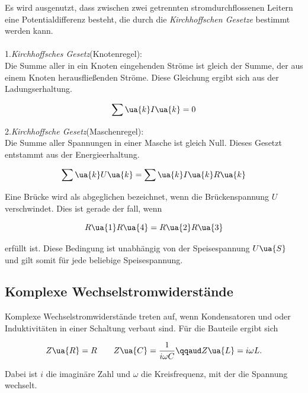 Es wird ausgenutzt, dass zwischen zwei getrennten stromdurchflossenen
Leitern eine Potentialdifferenz besteht, die durch die \emph{Kirchhoffschen Gesetze}
bestimmt werden kann.\\\\

1.\emph{Kirchhoffsches Gesetz}(Knotenregel):\\
Die Summe aller in ein Knoten eingehenden Ströme ist gleich der Summe, der aus
einem Knoten herausfließenden Ströme. Diese Gleichung ergibt sich aus der
Ladungserhaltung.

\begin{equation}
  \label{eqn:Kirchhoff1}
  \sum\ua{k} I\ua{k} = 0
\end{equation}

2.\emph{Kirchhoffsche Gesetz}(Maschenregel):\\
Die Summe aller Spannungen in einer Masche ist gleich Null.
Dieses Gesetzt entstammt aus der Energieerhaltung.

\begin{equation}
  \label{eqn:Krichhoff2}
  \sum\ua{k}U\ua{k} = \sum\ua{k}I\ua{k}R\ua{k}
\end{equation}

Eine Brücke wird als abgeglichen bezeichnet, wenn die Brückenspannung $U$ verschwindet.
Dies ist gerade der fall, wenn

\begin{equation}
  \label{eqn:abgleichbed}
  R\ua{1}R\ua{4} = R\ua{2}R\ua{3}
\end{equation}

erfüllt ist. Diese Bedingung ist unabhängig von der Speisespannung $U\ua{S}$
und gilt somit für jede beliebige Speisespannung.

\subsection{Komplexe Wechselstromwiderstände}

Komplexe Wechselstromwiderstände treten auf, wenn Kondensatoren und oder Induktivitäten
in einer Schaltung verbaut sind. Für die Bauteile ergibt sich

\begin{equation}
  Z\ua{R} = R \qquad Z\ua{C} = \frac{1}{i\omega C} \qqaud Z\ua{L} = i\omega L.
\end{equation}

Dabei ist $i$ die imaginäre Zahl und $\omega$ die Kreisfrequenz, mit der die
Spannung wechselt.

